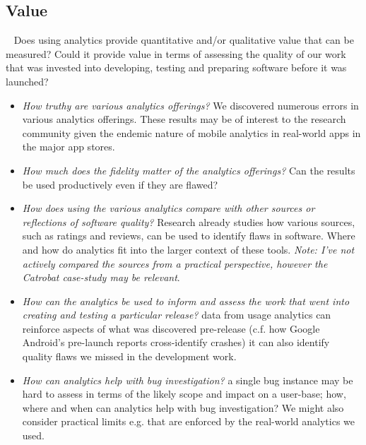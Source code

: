 \subsection{Value}~\label{section-value}
Does using analytics provide quantitative and/or qualitative value that can be measured? Could it provide value in terms of assessing the quality of our work that was invested into developing, testing and preparing software before it was launched?
\begin{itemize}
    \item \emph{How truthy are various analytics offerings?} We discovered numerous errors in various analytics offerings. These results may be of interest to the research community given the endemic nature of mobile analytics in real-world apps in the major app stores.
    \item \emph{How much does the fidelity matter of the analytics offerings?} Can the results be used productively even if they are flawed?
    \item \emph{How does using the various analytics compare with other sources or reflections of software quality?} Research already studies how various sources, such as ratings and reviews, can be used to identify flaws in software. Where and how do analytics fit into the larger context of these tools. \emph{Note: I've not actively compared the sources from a practical perspective, however the Catrobat case-study may be relevant}.
    \item \emph{How can the analytics be used to inform and assess the work that went into creating and testing a particular release?} data from usage analytics can reinforce aspects of what was discovered pre-release (c.f. how Google Android's pre-launch reports cross-identify crashes) it can also identify quality flaws we missed in the development work.
    \item \emph{How can analytics help with bug investigation?} a single bug instance may be hard to assess in terms of the likely scope and impact on a user-base; how, where and when can analytics help with bug investigation? We might also consider practical limits e.g. that are enforced by the real-world analytics we used. 
\end{itemize}

